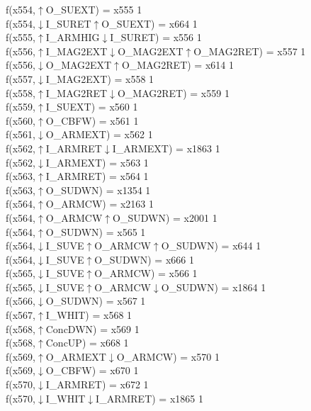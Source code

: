 f(x554,$\uparrow$O\_SUEXT) = x555 {1} \\
f(x554,$\downarrow$I\_SURET$\uparrow$O\_SUEXT) = x664 {1} \\
f(x555,$\uparrow$I\_ARMHIG$\downarrow$I\_SURET) = x556 {1} \\
f(x556,$\uparrow$I\_MAG2EXT$\downarrow$O\_MAG2EXT$\uparrow$O\_MAG2RET) = x557 {1} \\
f(x556,$\downarrow$O\_MAG2EXT$\uparrow$O\_MAG2RET) = x614 {1} \\
f(x557,$\downarrow$I\_MAG2EXT) = x558 {1} \\
f(x558,$\uparrow$I\_MAG2RET$\downarrow$O\_MAG2RET) = x559 {1} \\
f(x559,$\uparrow$I\_SUEXT) = x560 {1} \\
f(x560,$\uparrow$O\_CBFW) = x561 {1} \\
f(x561,$\downarrow$O\_ARMEXT) = x562 {1} \\
f(x562,$\uparrow$I\_ARMRET$\downarrow$I\_ARMEXT) = x1863 {1} \\
f(x562,$\downarrow$I\_ARMEXT) = x563 {1} \\
f(x563,$\uparrow$I\_ARMRET) = x564 {1} \\
f(x563,$\uparrow$O\_SUDWN) = x1354 {1} \\
f(x564,$\uparrow$O\_ARMCW) = x2163 {1} \\
f(x564,$\uparrow$O\_ARMCW$\uparrow$O\_SUDWN) = x2001 {1} \\
f(x564,$\uparrow$O\_SUDWN) = x565 {1} \\
f(x564,$\downarrow$I\_SUVE$\uparrow$O\_ARMCW$\uparrow$O\_SUDWN) = x644 {1} \\
f(x564,$\downarrow$I\_SUVE$\uparrow$O\_SUDWN) = x666 {1} \\
f(x565,$\downarrow$I\_SUVE$\uparrow$O\_ARMCW) = x566 {1} \\
f(x565,$\downarrow$I\_SUVE$\uparrow$O\_ARMCW$\downarrow$O\_SUDWN) = x1864 {1} \\
f(x566,$\downarrow$O\_SUDWN) = x567 {1} \\
f(x567,$\uparrow$I\_WHIT) = x568 {1} \\
f(x568,$\uparrow$ConcDWN) = x569 {1} \\
f(x568,$\uparrow$ConcUP) = x668 {1} \\
f(x569,$\uparrow$O\_ARMEXT$\downarrow$O\_ARMCW) = x570 {1} \\
f(x569,$\downarrow$O\_CBFW) = x670 {1} \\
f(x570,$\downarrow$I\_ARMRET) = x672 {1} \\
f(x570,$\downarrow$I\_WHIT$\downarrow$I\_ARMRET) = x1865 {1} \\
